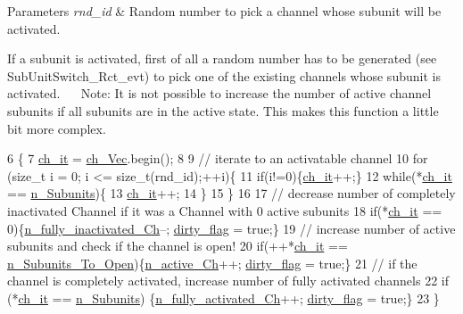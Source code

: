 \begin{DoxyParams}{Parameters}
{\em rnd\+\_\+id} & Random number to pick a channel whose subunit will be activated.\\
\hline
\end{DoxyParams}
If a subunit is activated, first of all a random number has to be generated (see Sub\+Unit\+Switch\+\_\+\+Rct\+\_\+evt) to pick one of the existing channels whose subunit is activated.~\newline
~\newline
Note\+: It is not possible to increase the number of active channel subunits if all subunits are in the active state. This makes this function a little bit more complex. 
\begin{DoxyCode}
6                                              \{
7     \hyperlink{classnw_1_1_channel___spc_a025013604067ea03dce585fb5a785408}{ch\_it} = \hyperlink{classnw_1_1_channel___spc_aca3ddf4eba759eeeb835bba168795a11}{ch\_Vec}.begin();
8 
9 \textcolor{comment}{//  iterate to an activatable channel}
10     \textcolor{keywordflow}{for} (\textcolor{keywordtype}{size\_t} i = 0; i <= size\_t(rnd\_id);++i)\{
11         \textcolor{keywordflow}{if}(i!=0)\{\hyperlink{classnw_1_1_channel___spc_a025013604067ea03dce585fb5a785408}{ch\_it}++;\}
12         \textcolor{keywordflow}{while}(*\hyperlink{classnw_1_1_channel___spc_a025013604067ea03dce585fb5a785408}{ch\_it} == \hyperlink{classnw_1_1_channel___spc_a2b63ef7e5147046919cf96060b57e078}{n\_Subunits})\{
13             \hyperlink{classnw_1_1_channel___spc_a025013604067ea03dce585fb5a785408}{ch\_it}++;
14         \}
15     \}
16 
17 \textcolor{comment}{//  decrease number of completely inactivated Channel if it was a Channel with 0 active subunits}
18     \textcolor{keywordflow}{if}(*\hyperlink{classnw_1_1_channel___spc_a025013604067ea03dce585fb5a785408}{ch\_it} == 0)\{\hyperlink{classnw_1_1_channel___spc_a35afc71aa0eeb5b1e4a2089a5c1f65ae}{n\_fully\_inactivated\_Ch}--; 
      \hyperlink{classnw_1_1___species_a79157bae3920ce7bba35e3f75b2aad6f}{dirty\_flag} = \textcolor{keyword}{true};\}
19 \textcolor{comment}{//  increase number of active subunits and check if the channel is open!}
20     \textcolor{keywordflow}{if}(++*\hyperlink{classnw_1_1_channel___spc_a025013604067ea03dce585fb5a785408}{ch\_it} == \hyperlink{classnw_1_1_channel___spc_a52e6e8aae67ebfb6cec1b79e7f125542}{n\_Subunits\_To\_Open})\{\hyperlink{classnw_1_1_channel___spc_a67fd1b83563c30ec86802bdab420c95d}{n\_active\_Ch}++; 
      \hyperlink{classnw_1_1___species_a79157bae3920ce7bba35e3f75b2aad6f}{dirty\_flag} = \textcolor{keyword}{true};\}
21 \textcolor{comment}{//  if the channel is completely activated, increase number of fully activated channels}
22     \textcolor{keywordflow}{if} (*\hyperlink{classnw_1_1_channel___spc_a025013604067ea03dce585fb5a785408}{ch\_it} == \hyperlink{classnw_1_1_channel___spc_a2b63ef7e5147046919cf96060b57e078}{n\_Subunits}) \{\hyperlink{classnw_1_1_channel___spc_ac6ae04b799c751bb61918b4ab163ce85}{n\_fully\_activated\_Ch}++; 
      \hyperlink{classnw_1_1___species_a79157bae3920ce7bba35e3f75b2aad6f}{dirty\_flag} = \textcolor{keyword}{true};\}
23 \}
\end{DoxyCode}

